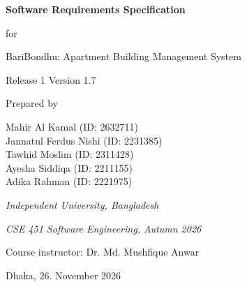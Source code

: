 \documentclass[11pt,a4paper]{report}
\begin{document}
\begin{titlepage}
  \centering
  \vspace*{2cm}
  {\Huge\bfseries Software Requirements Specification\par}
  \vspace{1cm}
  {\Large for\par}
  \vspace{1cm}
  {\huge BariBondhu: Apartment Building Management System\par}
  \vspace{0.6cm}
  {\large Release 1 \textperiodcentered{} Version 1.7\par}
  \vspace{2.5cm}
  {\large Prepared by\par}
  \vspace{0.5cm}
  {\large
    Mahir Al Kamal (ID: 2632711)\\[4pt]
    Jannatul Ferdus Nishi (ID: 2231385)\\[4pt]
    Tawhid Moslim (ID: 2311428)\\[4pt]
    Ayesha Siddiqa (ID: 2211155)\\[4pt]
    Adika Rahman (ID: 2221975)\\[4pt]
  }
  \vfill
  {\large\itshape Independent University, Bangladesh\par}
  \vspace{0.2cm}
  {\large\itshape CSE 451 Software Engineering, Autumn 2026\par}
  \vspace{0.2cm}
  {\large Course instructor: Dr. Md. Mushfique Anwar\par}
  \vspace{1cm}
  {\large Dhaka, 26. November 2026\par}
\end{titlepage}

\pagestyle{plain}
\end{document}
